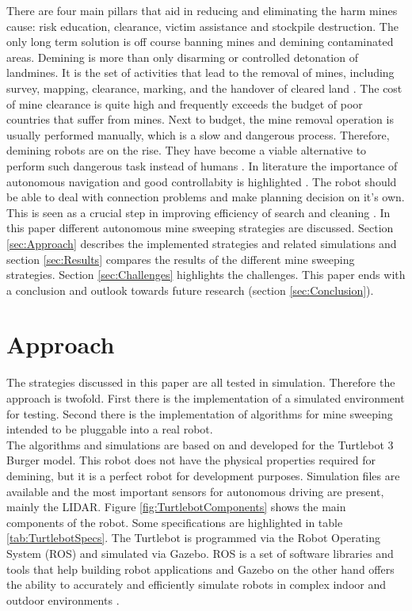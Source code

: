 \documentclass[conference]{IEEEtran}
\begin{document}
There are four main pillars that aid in reducing and eliminating the harm mines cause: risk education, clearance, victim assistance and stockpile destruction. The only long term solution is off course banning mines and demining contaminated areas. Demining is more than only disarming or controlled detonation of landmines. It is the set of activities that lead to the removal of mines, including survey, mapping, clearance, marking, and the handover of cleared land \cite{InternationalCampaigntoBanLandmines2020}.
The cost of mine clearance is quite high and frequently exceeds the budget of poor countries that suffer from mines. Next to budget, the mine removal operation is usually performed manually, which is a slow and dangerous process. Therefore, demining robots are on the rise. They have become a viable alternative to perform such dangerous task instead of humans \cite{Jaradat2018}. In literature the importance of autonomous navigation and good controllabity is highlighted \cite{Jaradat2018}. The robot should be able to deal with connection problems and make planning decision on it's own. This is seen as a crucial step in improving efficiency of search and cleaning \cite{Dogru2019}. In this paper different autonomous mine sweeping strategies are discussed. Section \ref{sec:Approach} describes the implemented strategies and related simulations and section \ref{sec:Results} compares the results of the different mine sweeping strategies. Section \ref{sec:Challenges} highlights the challenges. This paper ends with a conclusion and outlook towards future research (section \ref{sec:Conclusion}).


\section{Approach \label{sec:Approach}}

The strategies discussed in this paper are all tested in simulation. Therefore the approach is twofold. First there is the implementation of a simulated environment for testing. Second there is the implementation of algorithms for mine sweeping intended to be pluggable into a real robot. \\

The algorithms and simulations are based on and developed for the Turtlebot 3 Burger model. This robot does not have the physical properties required for demining, but it is a perfect robot for development purposes. Simulation files are available and the most important sensors for autonomous driving are present, mainly the LIDAR. Figure \ref{fig:TurtlebotComponents} shows the main components of the robot. Some specifications are highlighted in table \ref{tab:TurtlebotSpecs}. The Turtlebot is programmed via the Robot Operating System (ROS) and simulated via Gazebo. ROS is a set of software libraries and tools that help building robot applications and Gazebo on the other hand offers the ability to accurately and efficiently simulate robots in complex indoor and outdoor environments \cite{OpenSourceRoboticsFoundation2020} \cite{OpenRobotics2020}.
\end{document}
